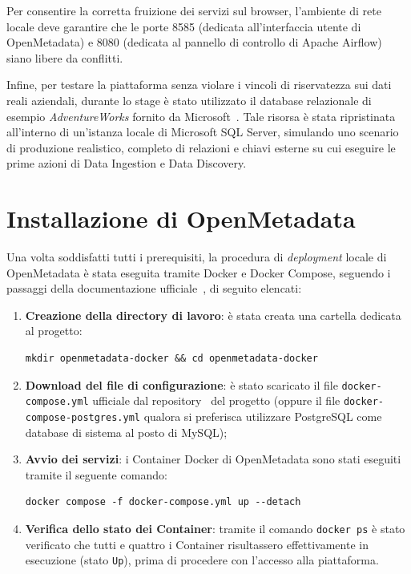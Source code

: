 Per consentire la corretta fruizione dei servizi sul browser, l'ambiente di rete locale deve garantire che le porte 8585 (dedicata all'interfaccia utente di OpenMetadata) 
e 8080 (dedicata al pannello di controllo di Apache Airflow) siano libere da conflitti.

Infine, per testare la piattaforma senza violare i vincoli di riservatezza sui dati reali aziendali, durante lo stage è stato utilizzato il 
database relazionale di esempio \emph{AdventureWorks} fornito da Microsoft~\cite{site:adventureworks}. 
Tale risorsa è stata ripristinata all'interno di un'istanza locale di Microsoft SQL Server, simulando uno scenario di produzione realistico, completo di 
relazioni e chiavi esterne su cui eseguire le prime azioni di Data Ingestion e Data Discovery.

\section{Installazione di OpenMetadata}
Una volta soddisfatti tutti i prerequisiti, la procedura di \emph{deployment} locale di OpenMetadata è stata eseguita tramite Docker e Docker Compose, 
seguendo i passaggi della documentazione ufficiale~\cite{site:openmetadata-docs}, di seguito elencati:
\begin{enumerate}
    \item \textbf{Creazione della directory di lavoro}: è stata creata una cartella dedicata al progetto:
    \begin{verbatim}
mkdir openmetadata-docker && cd openmetadata-docker
    \end{verbatim}
    \item \textbf{Download del file di configurazione}: è stato scaricato il file \texttt{docker-compose.yml} ufficiale dal repository~\cite{site:openmetadata-repo} del progetto (oppure il file \texttt{docker-compose-postgres.yml} qualora si preferisca utilizzare PostgreSQL come database di sistema al posto di MySQL);
    \item \textbf{Avvio dei servizi}: i Container Docker di OpenMetadata sono stati eseguiti tramite il seguente comando:
    \begin{verbatim}
docker compose -f docker-compose.yml up --detach
    \end{verbatim}
    \item \textbf{Verifica dello stato dei Container}: tramite il comando \texttt{docker ps} è stato verificato che tutti e quattro i Container risultassero effettivamente in esecuzione (stato \texttt{Up}), prima di procedere con l'accesso alla piattaforma.
\end{enumerate}

